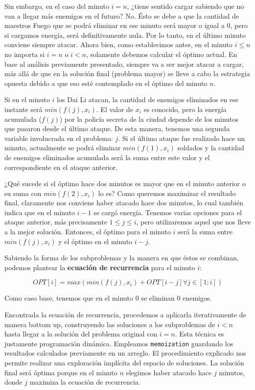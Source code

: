 \documentclass{article}
\begin{document}
Sin embargo, en el caso del minuto $i = n$, ¿tiene sentido cargar sabiendo que no van a llegar más enemigos en el futuro? No. Ésto se debe a que la cantidad de maestros Fuego que se podrá eliminar en ese minuto será mayor o igual a 0, pero si cargamos energía, será definitivamente nula. Por lo tanto, en el último minuto conviene siempre atacar. Ahora bien, como establecimos antes, en el minuto $i \leq n$ no importa si $i = n$ o $i < n$, solamente debemos calcular el óptimo actual. En base al análisis previamente presentado, siempre va a ser mejor atacar a cargar, más allá de que en la solución final (problema mayor) se lleve a cabo la estrategia opuesta debido a que eso esté contemplado en el óptimo del minuto $n$. 

Si en el minuto $i$ los Dai Li atacan, la cantidad de enemigos eliminados en ese instante será $min(f(j), x_i)$. El valor de $x_i$ es conocido, pero la energía acumulada ($f(j)$) por la policía secreta de la ciudad depende de los minutos que pasaron desde el último ataque. De esta manera, tenemos una segunda variable involucrada en el problema: $j$. Si el último ataque fue realizado hace un minuto, actualmente se podrá eliminar $min(f(1), x_i)$ soldados y la cantidad de enemigos eliminados acumulada será la suma entre este valor y el correspondiente en el ataque anterior. 

¿Qué sucede si el óptimo hace dos minutos es mayor que en el minuto anterior o su suma con $min(f(2), x_i)$ lo es? Como queremos maximizar el resultado final, claramente nos conviene haber atacado hace dos minutos, lo cual también indica que en el minuto $i - 1$ se cargó energía. Tenemos varias opciones para el ataque anterior, más precisamente $1 \leq j \leq i$, pero utilizaremos aquel que nos lleve a la mejor solución. Entonces, el óptimo para el minuto $i$ será la suma entre $min(f(j), x_i)$ y el óptimo en el minuto $i - j$.

Sabiendo la forma de los subproblemas y la manera en que éstos se combinan, podemos plantear la \textbf{ecuación de recurrencia} para el minuto $i$:

$$OPT[i] = max(min(f(j), x_i) + OPT[i - j] \forall j \in [1; i])$$

Como caso base, tenemos que en el minuto 0 se eliminan 0 enemigos.

Encontrada la ecuación de recurrencia, procedemos a aplicarla iterativamente de manera bottom up, construyendo las soluciones a los subproblemas de $i < n$ hasta llegar a la solución del problema original con $i = n$. Esta técnica es justamente programación dinámica. Empleamos \texttt{memoization} guardando los resultados calculados previamente en un arreglo. El procedimiento explicado nos permite realizar una exploración implícita del espacio de soluciones. La solución final será óptima porque en el minuto $n$ elegimos haber atacado hace $j$ minutos, donde $j$ maximiza la ecuación de recurrencia.
\end{document}
